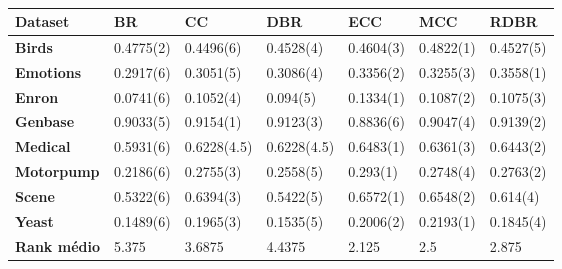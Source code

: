 \begin{table}[\tabmode]
\begin{tabular}{lllllll}
\hline
\textbf{Dataset} & \textbf{BR} & \textbf{CC} & \textbf{DBR} & \textbf{ECC} & \textbf{MCC} & \textbf{RDBR} \\ \hline
\textbf{Birds}           & 0.4775(2)   & 0.4496(6)   & 0.4528(4)    & 0.4604(3)    & 0.4822(1)    & 0.4527(5)     \\
\textbf{Emotions}        & 0.2917(6)   & 0.3051(5)   & 0.3086(4)    & 0.3356(2)    & 0.3255(3)    & 0.3558(1)     \\
\textbf{Enron}           & 0.0741(6)   & 0.1052(4)   & 0.094(5)     & 0.1334(1)    & 0.1087(2)    & 0.1075(3)     \\
\textbf{Genbase}         & 0.9033(5)   & 0.9154(1)   & 0.9123(3)    & 0.8836(6)    & 0.9047(4)    & 0.9139(2)     \\
\textbf{Medical}         & 0.5931(6)   & 0.6228(4.5) & 0.6228(4.5)  & 0.6483(1)    & 0.6361(3)    & 0.6443(2)     \\
\textbf{Motorpump}       & 0.2186(6)   & 0.2755(3)   & 0.2558(5)    & 0.293(1)     & 0.2748(4)    & 0.2763(2)     \\
\textbf{Scene}           & 0.5322(6)   & 0.6394(3)   & 0.5422(5)    & 0.6572(1)    & 0.6548(2)    & 0.614(4)      \\
\textbf{Yeast}           & 0.1489(6)   & 0.1965(3)   & 0.1535(5)    & 0.2006(2)    & 0.2193(1)    & 0.1845(4)     \\ \hline
\textbf{Rank médio}      & 5.375       & 3.6875      & 4.4375       & 2.125        & 2.5          & 2.875         \\ \hline
\end{tabular}
\caption{}
\label{tab:SAsvm}
\end{table}